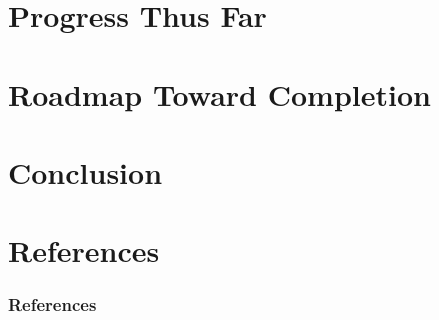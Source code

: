 \documentclass{beamer}
\begin{document}

\section{Progress Thus Far}


\section{Roadmap Toward Completion}


\section{Conclusion}


\section{References}

\begin{frame}[allowframebreaks]
\frametitle{References}




\end{frame}

\end{document}
